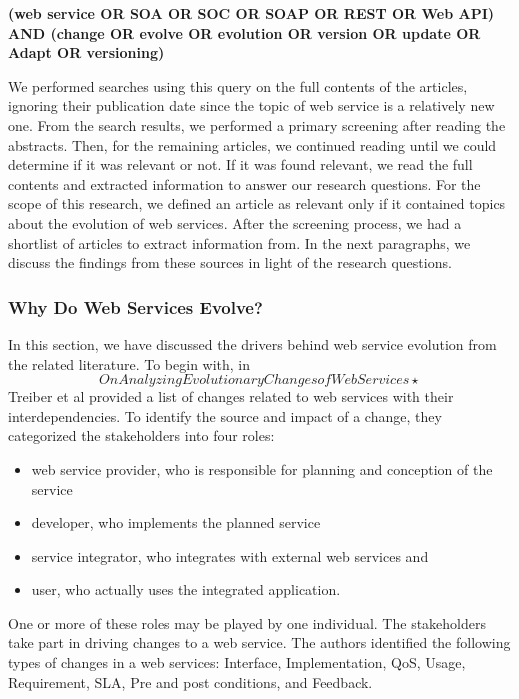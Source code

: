 \documentclass[runningheads,a4paper]{llncs}
\begin{document}
\textbf{(web service OR SOA OR SOC OR SOAP OR REST OR Web API)  AND (change OR evolve OR evolution OR version OR update OR Adapt OR versioning)}

We performed searches using this query on the full contents of the articles, ignoring their publication date since the topic of web service is a relatively new one. From the search results, we performed a primary screening after reading the abstracts. Then, for the remaining articles, we continued reading until we could determine if it was relevant or not. If it was found relevant, we read the full contents and extracted information to answer our research questions. For the scope of this research, we defined an article as relevant only if it contained topics about the evolution of web services. After the screening process, we had a shortlist of articles to extract information from. In the next paragraphs, we discuss the findings from these sources in light of the research questions.

\subsubsection{Why Do Web Services Evolve?} %
\label{sub:why_do_web_services_change}
In this section, we have discussed the drivers behind web service evolution from the related literature. To begin with, in \[On Analyzing Evolutionary Changes of Web Services⋆\] Treiber et al provided a list of changes related to web services with their interdependencies. To identify the source and impact of a change, they categorized the stakeholders into four roles:

\begin{itemize}
  \item web service provider, who is responsible for planning and conception of the service
  \item developer, who implements the planned service
  \item service integrator, who integrates with external web services and
  \item user, who actually uses the integrated application.
\end{itemize}

One or more of these roles may be played by one individual. The stakeholders take part in driving changes to a web service. The authors identified the following types of changes in a web services: Interface, Implementation, QoS, Usage, Requirement, SLA, Pre and post conditions, and Feedback.
\end{document}
